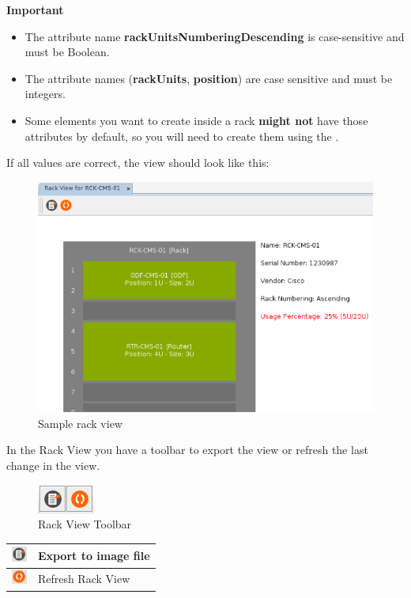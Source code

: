 \documentclass[a4paper]{article}
\begin{document}
		\newpage
		\begin{framed} {\large \textbf{Important}}
			\begin{itemize}
				\item The attribute name \textbf{rackUnitsNumberingDescending} is case-sensitive and must be Boolean.
				\item The attribute names (\textbf{rackUnits}, \textbf{position}) are case sensitive and must be integers.
				\item Some elements you want to create inside a rack \textbf{might not} have those attributes by default, so you will need to create them using the .			
			\end{itemize}
		\end{framed}
		\newpage		
		If all values are correct, the view should look like this:
		\begin{figure}[h!]
			\centering
			\includegraphics[width=0.7\linewidth]{img/rack_view_sample_view.png}
			\caption{Sample rack view}
			\label{fig:rack_view_sample_view}
		\end{figure}

		In the Rack View you have a toolbar to export the view or refresh the last change in the view.
		
		\begin{figure}[h!]
			\centering
			\includegraphics[width=0.1\linewidth]{img/rack_view_toolbar.png}
			\caption{Rack View Toolbar}
			\label{fig:rack_view_toolbar}
		\end{figure}
		
		\begin{table}[h!]
			\centering
			\begin{tabular}[h!]{lp{10cm}}
				\includegraphics[width=0.5cm]{img/icon_export.png} & Export to image file\\
				\midrule
				\includegraphics[width=0.5cm]{img/icon_refresh_view.png} & Refresh Rack View\\
				\midrule
			\end{tabular}
		\end{table}
		
\end{document}
